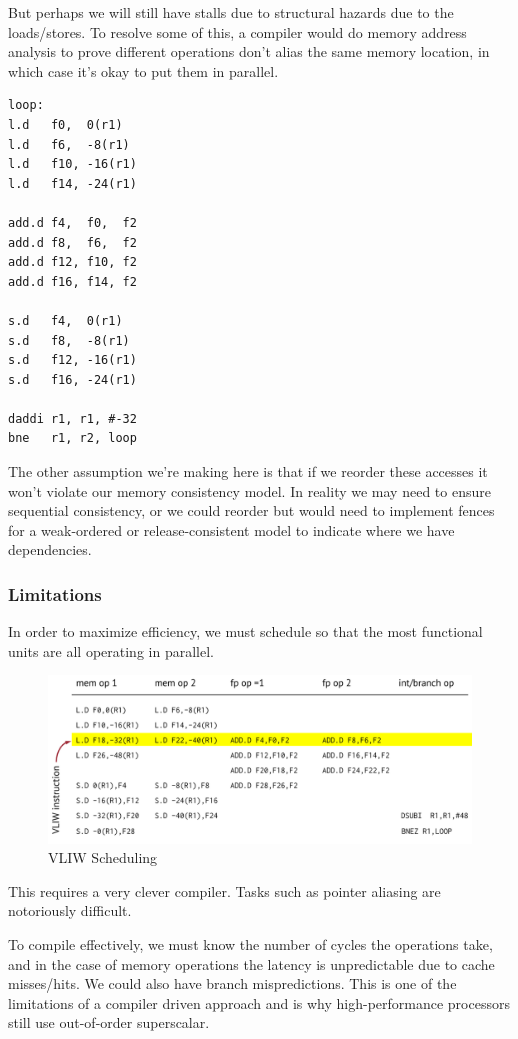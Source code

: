 \documentclass{article}
\begin{document}
But perhaps we will still have stalls due to structural hazards due to the loads/stores. To resolve some of this, a compiler would do memory address analysis to prove different operations don't alias the same memory location, in which case it's okay to put them in parallel. 

\scriptsize
\begin{verbatim}
loop:
l.d   f0,  0(r1)
l.d   f6,  -8(r1)
l.d   f10, -16(r1)
l.d   f14, -24(r1)

add.d f4,  f0,  f2
add.d f8,  f6,  f2
add.d f12, f10, f2
add.d f16, f14, f2

s.d   f4,  0(r1)
s.d   f8,  -8(r1)
s.d   f12, -16(r1)
s.d   f16, -24(r1)

daddi r1, r1, #-32
bne   r1, r2, loop
\end{verbatim}
\normalsize

The other assumption we're making here is that if we reorder these accesses it won't violate our memory consistency model. In reality we may need to ensure sequential consistency, or we could reorder but would need to implement fences for a weak-ordered or release-consistent model to indicate where we have dependencies.

\subsubsection{Limitations}

In order to maximize efficiency, we must schedule so that the most functional units are all operating in parallel. 

 \begin{figure}[ht!]
\centering
\includegraphics[width=120mm]{img/vliw2.png}
\caption{VLIW Scheduling}
\end{figure}

This requires a very clever compiler. Tasks such as pointer aliasing are notoriously difficult. 

To compile effectively, we must know the number of cycles the operations take, and in the case of memory operations the latency is unpredictable due to cache misses/hits. We could also have branch mispredictions. This is one of the limitations of a compiler driven approach and is why high-performance processors still use out-of-order superscalar. 
\end{document}
